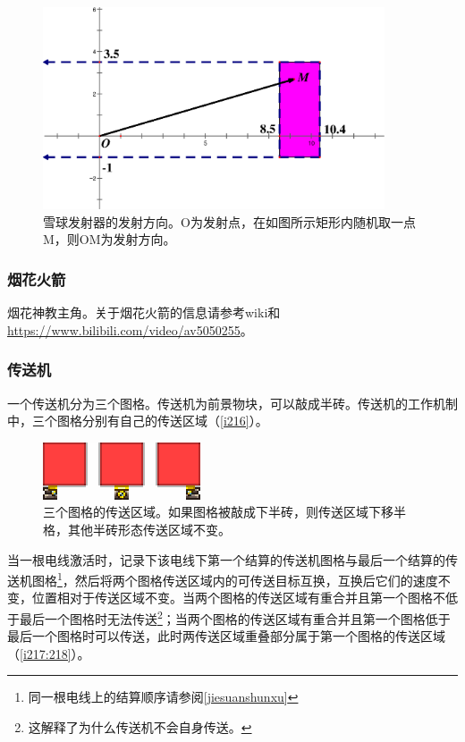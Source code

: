 \begin{figure}[h]
\centering
\includegraphics[width=0.9\textwidth]{images/1.eps}
\caption{雪球发射器的发射方向。O为发射点，在如图所示矩形内随机取一点M，则OM为发射方向。}\label{e1}
\end{figure}

\subsubsection{烟花火箭}
烟花神教主角。关于烟花火箭的信息请参考wiki和\url{https://www.bilibili.com/video/av5050255}。

\subsubsection{传送机}\label{chuansongji}
一个传送机分为三个图格。传送机为前景物块，可以敲成半砖。传送机的工作机制中，三个图格分别有自己的传送区域（\autoref{i216}）。

\begin{figure}[!h]
\centering
\includegraphics{images/216.png}
\caption{三个图格的传送区域。如果图格被敲成下半砖，则传送区域下移半格，其他半砖形态传送区域不变。}
\label{i216}
\end{figure}

当一根电线激活时，记录下该电线下第一个结算的传送机图格与最后一个结算的传送机图格\footnote{同一根电线上的结算顺序请参阅\autoref{jiesuanshunxu}}，然后将两个图格传送区域内的可传送目标互换，互换后它们的速度不变，位置相对于传送区域不变。当两个图格的传送区域有重合并且第一个图格不低于最后一个图格时无法传送\footnote{这解释了为什么传送机不会自身传送。}；当两个图格的传送区域有重合并且第一个图格低于最后一个图格时可以传送，此时两传送区域重叠部分属于第一个图格的传送区域（\autoref{i217:218}）。

